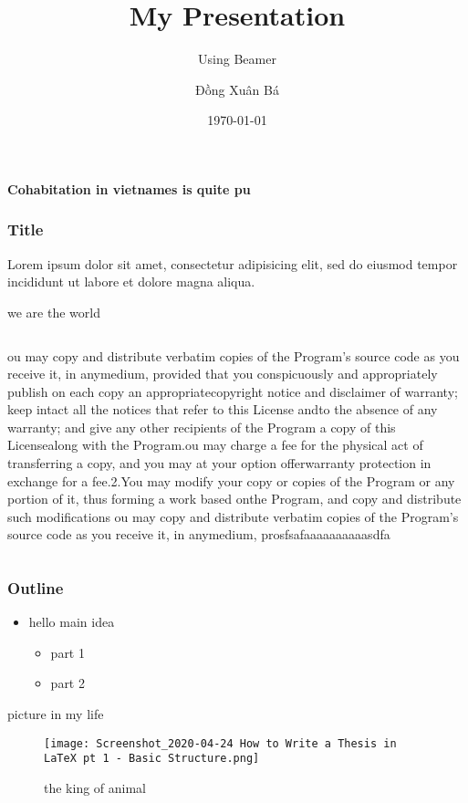 \documentclass{beamer}
\title{My Presentation}
\subtitle{Using Beamer}
\author{Đồng Xuân Bá}
\institute{Bách Khoa Hà Nội}
\date{\today}
\begin{document}
 
     \begin{frame}{\textbf{Cohabitation in vietnames is quite pu}}
\end{frame}
 
\begin{frame}
\frametitle{Title}
Lorem ipsum dolor sit amet, consectetur adipisicing elit, sed do eiusmod tempor incididunt ut labore et dolore magna aliqua.
\end{frame}
\begin{frame}{we are the world}
    \begin{columns}
    ou may copy and \vspace{0.5cm}distribute verbatim copies of the Program’s source code as you receive it, in anymedium, provided that you conspicuously and appropriately publish on each copy an appropriatecopyright notice and disclaimer of warranty; keep intact all the notices that refer to this License andto the absence of any warranty; and give any other recipients of the Program a copy of this Licensealong with the Program.\vspace{0.25}ou may charge a fee for the physical act of transferring a copy, and you may at your option offerwarranty protection in exchange for a fee.2.You may modify your copy or copies of the Program or any portion of it, thus forming a work based onthe Program, and copy and distribute such modifications 
    ou may copy and distribute verbatim copies of the Program’s source code as you receive it, in anymedium, prosfsafaaaaaaaaaasdfa
    \end{columns}
\end{frame}
\begin{frame}
\frametitle{Outline}
\begin{itemize}
    \item hello
    \pause
    \time main idea
    \pause
    \begin{itemize}
        \item part 1
        \pause
        \item part 2
    \end{itemize}
\end{itemize}
\tableofcontents
\end{frame}
\begin{frame}{picture in my life}
    \begin{figure}
        \centering
        \texttt{[image: Screenshot\_2020-04-24 How to Write a Thesis in LaTeX pt 1 - Basic Structure.png]}
        \caption{the king of animal }
        \label{fig:my_label}
    \end{figure}
\end{frame}
\end{document}
